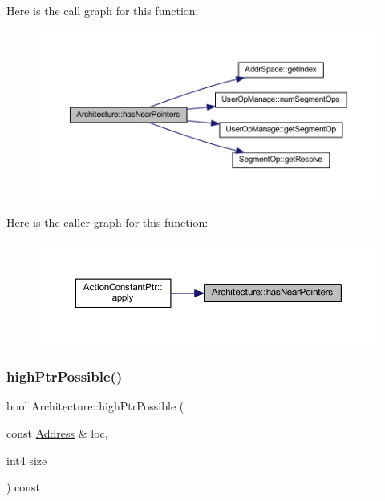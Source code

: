 Here is the call graph for this function\+:
\nopagebreak
\begin{figure}[H]
\begin{center}
\leavevmode
\includegraphics[width=350pt]{class_architecture_a70c9e30f83ab8aba74049198f802baa7_cgraph}
\end{center}
\end{figure}
Here is the caller graph for this function\+:
\nopagebreak
\begin{figure}[H]
\begin{center}
\leavevmode
\includegraphics[width=350pt]{class_architecture_a70c9e30f83ab8aba74049198f802baa7_icgraph}
\end{center}
\end{figure}
\mbox{\label{class_architecture_a9ec2e6c18d4b1280dc955ec0ace7d476}} 
\subsubsection{\texorpdfstring{highPtrPossible()}{highPtrPossible()}}
{\footnotesize\ttfamily bool Architecture\+::high\+Ptr\+Possible (\begin{DoxyParamCaption}\item[{const \mbox{\hyperlink{class_address}{Address}} \&}]{loc,  }\item[{int4}]{size }\end{DoxyParamCaption}) const\hspace{0.3cm}{\ttfamily [inline]}}



